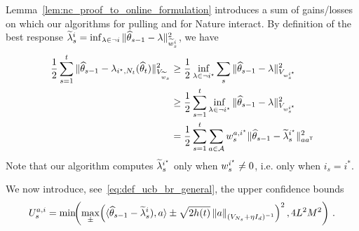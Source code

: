 Lemma~\ref{lem:nc_proof_to_online_formulation} introduces a sum of gains/losses on which our algorithms for pulling and for Nature interact.
By definition of the best response $\widetilde{\lambda}_s^i = \inf_{\lambda \in \neg i} \Vert \widehat{\theta}_{s-1} - \lambda \Vert_{\widetilde{w}_s^i}^2$, we have
\begin{align}
\frac{1}{2}\sum_{s=1}^t  \Vert \widehat{\theta}_{s-1} - \lambda_{i^\star,N_t}(\widehat{\theta}_t)\Vert_{V_{\widetilde{w}_s}}^2
&\ge \frac{1}{2} \inf_{\lambda \in \neg i^\star} \sum_s \Vert \widehat{\theta}_{s-1} - \lambda\Vert_{V_{w_s^{i^\star}}}^2
\nonumber\\
&\geq \frac{1}{2}\sum_{s=1}^t \inf_{\lambda \in \neg i^\star} \Vert \widehat{\theta}_{s-1} - \lambda\Vert_{V_{w_s^{i^\star}}}^2
\nonumber\\
&= \frac{1}{2}\sum_{s=1}^t \sum_{a\in\mathcal{A}} w_s^{a,i^\star}\Vert \widehat{\theta}_{s-1} - \widetilde{\lambda}_s^{i^\star}\Vert_{a a^{\mathsf{\scriptscriptstyle T}}}^2\label{eq:only_istar}
\end{align}
Note that our algorithm computes $\widetilde{\lambda}_s^{i^\star}$ only when $w_s^{i^\star} \neq 0$, i.e. only when $i_s = i^*$.

We now introduce, see~\eqref{eq:def_ucb_br_general}, the upper confidence bounds
\[
    U_s^{a,i} = \min\!\!\left(\max_\pm\! \left( \langle \widehat{\theta}_{s-1} - \widetilde{\lambda}^{i}_s), a\rangle \pm \sqrt{2 h(t)} \left\lVert a\right\rVert_{(V_{N_s}+\eta I_d)^{-1} } \right)^2,4L^2M^2\right)\,.
\]

